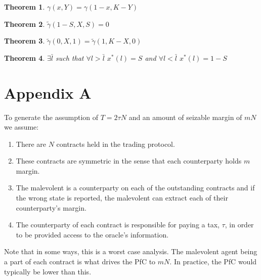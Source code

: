 \documentclass[12pt]{article}
\newtheorem{thm}{Theorem}
\begin{document}
  \begin{thm}
    $\gamma(x, Y) = \gamma(1 - x, K - Y)$
  \end{thm}

  \begin{thm}
    $\tilde{\gamma}(1 - S, X, S) = 0$
  \end{thm}

  \begin{thm}
    $\tilde{\gamma}(0, X, 1) = \tilde{\gamma}(1, K-X, 0)$
  \end{thm}

  \begin{thm}
    $\exists \bar{l}$ such that $\forall l > \bar{l}$ $x^*(l) = S$ and $\forall l < \bar{l}$ $x^*(l) = 1-S$
  \end{thm}


\section{Appendix A}

  To generate the assumption of $T = 2 \tau N$ and an amount of seizable margin of $mN$ we assume:

  \begin{enumerate}
    \item There are $N$ contracts held in the trading protocol.
    \item These contracts are symmetric in the sense that each counterparty holds $m$ margin.
    \item The malevolent is a counterparty on each of the outstanding contracts and if the wrong
    state is reported, the malevolent can extract each of their counterparty's margin.
    \item The counterparty of each contract is responsible for paying a tax, $\tau$, in order to
    be provided access to the oracle's information.
  \end{enumerate}

  Note that in some ways, this is a worst case analysis. The malevolent agent being a part of each
  contract is what drives the PfC to $mN$. In practice, the PfC would typically be lower than this.
\end{document}
